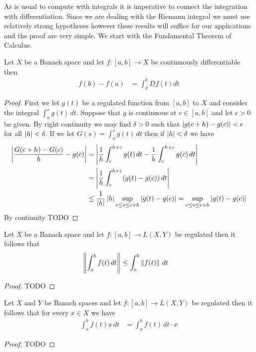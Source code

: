 As is usual to compute with integrals it is imperative to connect the
integration with differentiation.  Since we are dealing with the
Riemann integral we must use relatively strong hypotheses however
these results will suffice for our applications and the proof are very
simple.  We start with the Fundamental Theorem of Calculus.

\begin{thm}\label{FundamentalTheoremOfCalculusForBanachSpaceRiemannIntegrals}Let
 $X$ be a Banach space and let $f : [a,b] \to X$ be continuously
 differentiable then 
\begin{align*}
f(b) - f(a) &= \int_a^b Df(t) dt
\end{align*}
\end{thm}
\begin{proof}
First we let $g(t)$ be a regulated function from $[a,b]$ to $X$ and
consider the integral $\int_a^s g(t) \, dt$.  Suppose that $g$ is
continuous at $c \in [a,b]$ and let $\epsilon > 0$ be given.  By
right continuity we may find $\delta > 0$ such that $\left \vert g(c+h) -
  g(c) \right \vert < \epsilon$ for all $\left \vert h \right \vert < \delta$.  If we let $G(s) = \int_a^s g(t) \,
dt$ then if $\left \vert h \right \vert < \delta$ we have
\begin{align*}
\left \vert  \frac{G(c + h) - G(c)}{h} - g(c) \right \vert &= \left \vert \frac{1}{h}
                                          \int_c^{h+c} g(t)\, dt  -
                                          \frac{1}{h} \int_c^{h+c}
                                          g(c) \, dt \right \vert \\
&= \left \vert \frac{1}{h}  \int_c^{h+c} (g(t) - g(c)) \, dt \right \vert \\
&\leq \frac{1}{\left \vert h \right \vert} \left \vert h \right \vert \sup_{c \leq s \leq c+h} \left \vert g(t) -
  g(c) \right \vert 
=\sup_{c \leq s \leq c+h} \left \vert g(t) -  g(c) \right \vert 
\end{align*}
By continuity
TODO
\end{proof}

\begin{prop}\label{NormRiemannIntegralBanachSpace}Let $X$ be a
  Banach space and let $f : [a,b] \to L(X,Y)$ be regulated then it
  follows that 
\begin{align*}
\left \lVert \int_a^b f(t) \, dt \right \rVert &\leq \int_a^b \left \lVert f(t) \right \rVert \, dt
\end{align*}
\end{prop}
\begin{proof}
TODO
\end{proof}

\begin{prop}\label{RiemannIntegralOfContinuousMaps}Let $X$ and $Y$ be
  Banach spaces and let $f : [a,b] \to L(X,Y)$ be regulated then it
  follows that for every $x \in X$ we have
\begin{align*}
\int_a^b f(t) x \, dt &= \int_a^b f(t) \, dt \cdot x
\end{align*}
\end{prop}
\begin{proof}
TODO
\end{proof}

